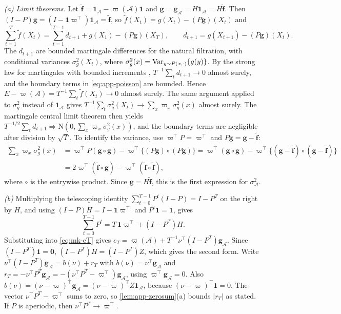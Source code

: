 \emph{(a) Limit theorems.} Let $\tilde{\bm f}=\bm1_{\mathcal A}-\varpi(\mathcal A)\bm1$ and $\bm g=\bm g_{\mathcal A}=H\bm1_{\mathcal A}=H\tilde{\bm f}$. Then $(I-P)\bm g=(I-\bm1\varpi^{\top})\bm1_{\mathcal A}=\tilde{\bm f}$, so $\tilde f(X_t)=g(X_t)-(P\bm g)(X_t)$ and
\begin{equation}\label{eq:app-poisson}
  \sum_{t=1}^{T}\tilde f(X_t)=\sum_{t=1}^{T-1}d_{t+1}+g(X_1)-(P\bm g)(X_T),\qquad d_{t+1}=g(X_{t+1})-(P\bm g)(X_t).
\end{equation}
The $d_{t+1}$ are bounded martingale differences for the natural filtration, with conditional variances $\sigma^2_g(X_t)$, where $\sigma^2_g(x)=\operatorname{Var}_{y\sim P(x,\cdot)}\{g(y)\}$. By the strong law for martingales with bounded increments \citep[Ch.~2]{hall1980}, $T^{-1}\sum_td_{t+1}\to0$ almost surely, and the boundary terms in \eqref{eq:app-poisson} are bounded. Hence $E-\varpi(\mathcal A)=T^{-1}\sum_t\tilde f(X_t)\to0$ almost surely. The same argument applied to $\sigma^2_g$ instead of $\bm1_{\mathcal A}$ gives $T^{-1}\sum_t\sigma^2_g(X_t)\to\sum_x\varpi_x\sigma^2_g(x)$ almost surely. The martingale central limit theorem \citep[Ch.~3]{hall1980} then yields $T^{-1/2}\sum_td_{t+1}\Rightarrow\mathrm N(0,\sum_x\varpi_x\sigma^2_g(x))$, and the boundary terms are negligible after division by $\sqrt T$. To identify the variance, use $\varpi^{\top}P=\varpi^{\top}$ and $P\bm g=\bm g-\tilde{\bm f}$:
\[
\begin{aligned}
  \sum_x\varpi_x\sigma^2_g(x)&=\varpi^{\top}P(\bm g\circ\bm g)-\varpi^{\top}\{(P\bm g)\circ(P\bm g)\}
  =\varpi^{\top}(\bm g\circ\bm g)-\varpi^{\top}\{(\bm g-\tilde{\bm f})\circ(\bm g-\tilde{\bm f})\}\\
  &=2\varpi^{\top}(\tilde{\bm f}\circ\bm g)-\varpi^{\top}(\tilde{\bm f}\circ\tilde{\bm f}),
\end{aligned}
\]
where $\circ$ is the entrywise product. Since $\bm g=H\tilde{\bm f}$, this is the first expression for $\sigma^2_{\mathcal A}$.

\emph{(b)} Multiplying the telescoping identity $\sum_{t=0}^{T-1}P^t(I-P)=I-P^T$ on the right by $H$, and using $(I-P)H=I-\bm1\varpi^{\top}$ and $P^t\bm1=\bm1$, gives
\begin{equation}\label{eq:app-sumP}
  \sum_{t=0}^{T-1}P^t=T\,\bm1\varpi^{\top}+(I-P^T)H .
\end{equation}
Substituting into \eqref{eq:mk-eT} gives $e_T=\varpi(\mathcal A)+T^{-1}\nu^{\top}(I-P^T)\bm g_{\mathcal A}$. Since $(I-P^T)\bm1=\bm0$, $(I-P^T)H=(I-P^T)Z$, which gives the second form. Write $\nu^{\top}(I-P^T)\bm g_{\mathcal A}=b(\nu)+r_T$ with $b(\nu)=\nu^{\top}\bm g_{\mathcal A}$ and $r_T=-\nu^{\top}P^T\bm g_{\mathcal A}=-(\nu^{\top}P^T-\varpi^{\top})\bm g_{\mathcal A}$, using $\varpi^{\top}\bm g_{\mathcal A}=0$. Also $b(\nu)=(\nu-\varpi)^{\top}\bm g_{\mathcal A}=(\nu-\varpi)^{\top}Z\bm1_{\mathcal A}$, because $(\nu-\varpi)^{\top}\bm1=0$. The vector $\nu^{\top}P^T-\varpi^{\top}$ sums to zero, so \cref{lem:app-zerosum}(a) bounds $|r_T|$ as stated. If $P$ is aperiodic, then $\nu^{\top}P^T\to\varpi^{\top}$.

